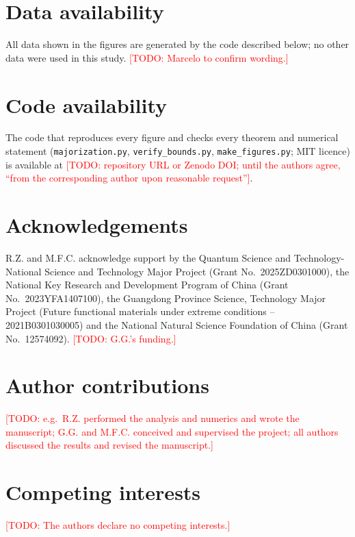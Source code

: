 \documentclass[11pt]{article}
\theoremstyle{definition}
\newcommand{\todo}[1]{\textcolor{red}{[TODO: #1]}}
\begin{document}
\section*{Data availability}
All data shown in the figures are generated by the code described below; no
other data were used in this study. \todo{Marcelo to confirm wording.}

\section*{Code availability}
The code that reproduces every figure and checks every theorem and numerical
statement (\texttt{majorization.py}, \texttt{verify\_bounds.py},
\texttt{make\_figures.py}; MIT licence) is available at
\todo{repository URL or Zenodo DOI; until the authors agree, ``from the
corresponding author upon reasonable request''}.

\section*{Acknowledgements}
R.Z. and M.F.C. acknowledge support by the Quantum Science and
Technology-National Science and Technology Major Project (Grant
No.~2025ZD0301000), the National Key Research and Development Program of China
(Grant No.~2023YFA1407100), the Guangdong Province Science, Technology Major
Project (Future functional materials under extreme conditions --
2021B0301030005) and the National Natural Science Foundation of China (Grant
No.~12574092). \todo{G.G.'s funding.}

\section*{Author contributions}
\todo{e.g.\ R.Z. performed the analysis and numerics and wrote the manuscript;
G.G. and M.F.C. conceived and supervised the project; all authors discussed the
results and revised the manuscript.}

\section*{Competing interests}
\todo{The authors declare no competing interests.}



\end{document}
